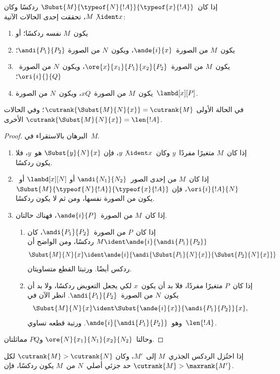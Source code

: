 \documentclass[../../../include/open-logic-section]{subfiles}
\begin{document}
\begin{lem}
  إذا كان~$\Subst{M}{\typeof{N}{!A}}{\typeof{x}{!A}}$ ردكسًا وكان
  $M\not\ident x$، تحققت إحدى الحالات الآتية:
  \begin{enumerate}
  \item يكون~$M$ نفسه ردكسًا؛ أو
  \item يكون~$M$ من الصورة~$\ande{i}{x}$، ويكون~$N$ من الصورة
    $\andi{P_1}{P_2}$؛
  \item يكون~$M$ من الصورة~$\ore{x}{x_1}{P_1}{x_2}{P_2}$، ويكون~$N$
    من الصورة~$\ori{i}{}{Q}$؛
  \item يكون~$M$ من الصورة~$xQ$، ويكون~$N$ من الصورة~$\lambd[x][P]$.
  \end{enumerate}
  في الحالة الأولى
  $\cutrank{\Subst{M}{N}{x}}=\cutrank{M}$؛ وفي الحالات الأخرى
  $\cutrank{\Subst{M}{N}{x}}=\len{!A}$.
\end{lem}
\begin{proof}
  البرهان بالاستقراء في~$M$.
  \begin{enumerate}
  \item إذا كان~$M$ متغيرًا مفردًا~$y$ وكان~$y\not\ident x$، فإن
    $\Subst{y}{N}{x}$ هو~$y$، فلا يكون ردكسًا.
  \item إذا كان~$M$ من إحدى الصور~$\andi{N_1}{N_2}$ أو
    $\lambd[x][N]$ أو~$\ori{i}{!A}{N}$، فإن
    $\Subst{M}{\typeof{N}{!A}}{\typeof{x}{!A}}$ يكون من الصورة نفسها،
    ومن ثم لا يكون ردكسًا.
  \item إذا كان~$M$ من الصورة~$\ande{i}{P}$، فهناك حالتان.
    \begin{enumerate}
      \item إذا كان~$P$ من الصورة~$\andi{P_1}{P_2}$، كان
        $M\ident\ande{i}{\andi{P_1}{P_2}}$ ردكسًا، ومن الواضح أن
        \[
        \Subst{M}{N}{x}\ident
        \ande{i}{\andi{\Subst{P_1}{N}{x}}{\Subst{P_2}{N}{x}}}
        \]
        ردكس أيضًا. ورتبتا القطع متساويتان.
      \item إذا كان~$P$ متغيرًا مفردًا، فلا بد أن يكون~$x$ لكي يجعل
        التعويض ردكسًا، ولا بد أن يكون~$N$ من الصورة~$\andi{P_1}{P_2}$.
        انظر الآن في
        \[
        \Subst{M}{N}{x}\ident
        \Subst{\ande{i}{x}}{\andi{P_1}{P_2}}{x},
        \]
        وهو~$\ande{i}{\andi{P_1}{P_2}}$. ورتبة قطعه تساوي~$\len{!A}$.
    \end{enumerate}
  \end{enumerate}
  وحالتا~$\ore{N}{x_1}{N_1}{x_2}{N_2}$ و$PQ$ مماثلتان.
\end{proof}

\begin{lem}
  إذا اختُزل الردكس الجذري~$M$ إلى~$M'$، وكان
  $\cutrank{M}>\cutrank{N}$ لكل حد جزئي أصلي~$N$ من~$M$ يكون ردكسًا، فإن
  $\cutrank{M}>\maxrank{M'}$.
\end{lem}
\end{document}
